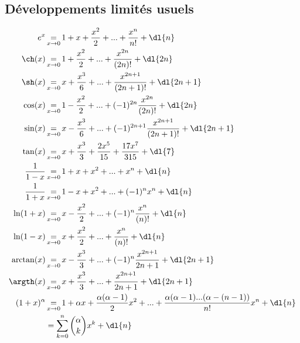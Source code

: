\def\theme{Statistique à une ou deux variables, représentation et analyse de données}
\def\date{02/12/2023}

\def\eq{&\operatorname*{=}_{x \rightarrow 0}}
\def\ppp{+ ... +}
\newcommand{\pdl}[1]{
    + \dl{#1}\\
}

\hbox{\vspace{-0.7cm}}

\subsection{Développements limités usuels}
\vspace{-1cm}
\begin{align*}
    e^x \eq 1 + x + \dfrac{x^2}{2} \ppp \dfrac{x^n}{n!} \pdl{n}
    \ch(x) \eq 1 + \dfrac{x^2}{2} \ppp \dfrac{x^{2n}}{(2n)!} \pdl{2n}
    \sh(x) \eq x + \dfrac{x^3}{6} \ppp \dfrac{x^{2n+1}}{(2n+1)!} \pdl{2n+1}
    \cos(x) \eq 1 - \dfrac{x^2}{2} \ppp (-1)^{2n}\dfrac{x^{2n}}{(2n)!} \pdl{2n}
    \sin(x) \eq x - \dfrac{x^3}{6} \ppp (-1)^{2n+1}\dfrac{x^{2n+1}}{(2n+1)!} \pdl{2n+1}
    \tan(x) \eq x + \dfrac{x^3}{3} + \dfrac{2x^5}{15} + \dfrac{17x^7}{315} \pdl{7}
    \dfrac{1}{1-x} \eq 1 + x + x^2 \ppp x^n \pdl{n}
    \dfrac{1}{1+x} \eq 1 - x + x^2 \ppp (-1)^{n} x^n \pdl{n}
    \ln(1+x) \eq x - \dfrac{x^2}{2} \ppp (-1)^{n}\dfrac{x^{n}}{(n)!} \pdl{n}
    \ln(1-x) \eq x + \dfrac{x^2}{2} \ppp \dfrac{x^{n}}{(n)!} \pdl{n}
    \arctan(x) \eq x - \dfrac{x^3}{3} \ppp (-1)^{n}\dfrac{x^{2n+1}}{2n+1} \pdl{2n+1}
    \argth(x) \eq x + \dfrac{x^3}{3} \ppp \dfrac{x^{2n+1}}{2n+1} \pdl{2n+1}
    (1+x)^\alpha \eq  1 + \alpha x + \dfrac{\alpha(\alpha-1)}{2}x^2 
    \ppp \dfrac{\alpha(\alpha-1) ... (\alpha-(n-1))}{n!}x^n \pdl{n}
    &= \sum_{k=0}^{n}\binom{\alpha}{k}x^k \pdl{n}
\end{align*}
